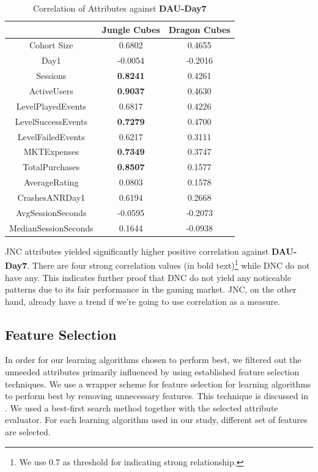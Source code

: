 \begin{table}[h]
\centering
\caption{Correlation of Attributes against \textbf{DAU-Day7}}
\label{table:correlation_table}
\begin{tabular}{|c|c|c|}
\hline 
 & Jungle Cubes & Dragon Cubes\\ 
\hline 
Cohort Size & 0.6802 & 0.4655\\ 
\hline 
Day1 & -0.0054 & -0.2016\\ 
\hline 
Sessions & \textbf{0.8241} & 0.4261\\ 
\hline 
ActiveUsers & \textbf{0.9037} & 0.4630\\ 
\hline 
LevelPlayedEvents & 0.6817& 0.4226\\ 
\hline 
LevelSuccessEvents & \textbf{0.7279} & 0.4700\\ 
\hline 
LevelFailedEvents & 0.6217 & 0.3111\\ 
\hline 
MKTExpenses & \textbf{0.7349} & 0.3747\\ 
\hline 
TotalPurchases &\textbf{ 0.8507} & 0.1577\\ 
\hline 
AverageRating & 0.0803 & 0.1578\\ 
\hline 
CrashesANRDay1 & 0.6194 & 0.2668\\ 
\hline 
AvgSessionSeconds & -0.0595 & -0.2073\\
\hline 
MedianSessionSeconds & 0.1644 & -0.0938\\  
\hline
\end{tabular}
\end{table} 

JNC attributes yielded significantly higher positive correlation against \textbf{DAU-Day7}. There are four strong correlation values (in bold text)\footnote{We use 0.7 as threshold for indicating strong relationship.} while DNC do not have any. This indicates further proof that DNC do not yield any noticeable patterns due to its fair performance in the gaming market. JNC, on the other hand, already have a trend if we're going to use correlation as a measure.

\subsection{Feature Selection}
In order for our learning algorithms chosen to perform best, we filtered out the unneeded attributes primarily influenced by using established feature selection techniques. We use a wrapper scheme for feature selection for learning algorithms to perform best by removing unnecessary features. This technique is discussed in \cite{ref:wrappers_feature_selection}. We used a best-first search method together with the selected attribute evaluator. For each learning algorithm used in our study, different set of features are selected.

